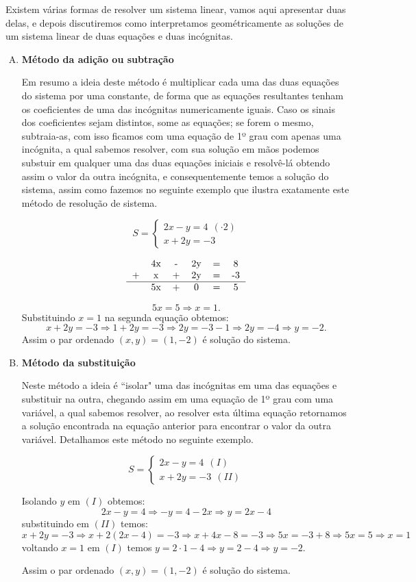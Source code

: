 Existem várias formas de resolver um sistema linear, vamos aqui apresentar duas delas, e depois discutiremos como interpretamos geométricamente as soluções de um sistema linear de duas equações e duas incógnitas.

\begin{enumerate}[A)]
 \item \textbf{Método da adição ou subtração}

 Em resumo a ideia deste método é multiplicar cada uma das duas equações do sistema por uma constante, de forma que as equações resultantes tenham os coeficientes de uma das incógnitas numericamente iguais. Caso os sinais dos coeficientes sejam distintos, some as equações; se forem o mesmo, subtraia-as, com isso ficamos com uma equação de 1º grau com apenas uma incógnita, a qual sabemos resolver, com sua solução em mãos podemos substuir em qualquer uma das duas equações iniciais e resolvê-lá obtendo assim o valor da outra incógnita, e consequentemente temos a solução do sistema, assim como fazemos no seguinte exemplo que ilustra exatamente este método de resolução de sistema.

 \[S= \begin{cases}
      2x - y= 4 \ \ (\cdot 2)\\
      x + 2y= -3
     \end{cases}\]

$$\begin{tabular}{cccccc}
   & 4x & -  & 2y  & =  & 8  \\
 + & x & + & 2y & = & -3 \\\hline
   & 5x & + & 0 & = & 5 \\
\end{tabular}$$

\[5x= 5 \Rightarrow x=1.\]
Substituindo $x=1$ na segunda equação obtemos:
\[x + 2y= -3 \Rightarrow 1 + 2y= -3 \Rightarrow 2y = -3 -1 \Rightarrow 2y= -4 \Rightarrow y=-2.\]
Assim o par ordenado $(x, y)= (1, -2)$ é solução do sistema.

 \item \textbf{Método da substituição}

 Neste método a ideia é ``isolar" uma das incógnitas em uma das equações e substituir na outra, chegando assim em uma equação de 1º grau com uma variável, a qual sabemos resolver, ao resolver esta última equação retornamos a solução encontrada na equação anterior para encontrar o valor da outra variável. Detalhamos este método no seguinte exemplo.

 \[S= \begin{cases}
      2x - y= 4 \ \ (I)\\
      x + 2y= -3 \ \ (II)
     \end{cases}\]

 Isolando $y$ em $(I)$ obtemos:
 \[2x - y= 4 \Rightarrow -y = 4 -2x \Rightarrow y = 2x -4\]
 substituindo em $(II)$ temos:
 \[x + 2y= -3 \Rightarrow x + 2(2x - 4)= -3 \Rightarrow x + 4x - 8= -3 \Rightarrow 5x= -3 + 8 \Rightarrow 5x=5 \Rightarrow x=1\]
 voltando $x= 1$ em $(I)$ temos $y= 2 \cdot 1 - 4 \Rightarrow  y= 2 -4 \Rightarrow y= -2$.

 Assim o par ordenado $(x, y)= (1, -2)$ é solução do sistema.
\end{enumerate}

